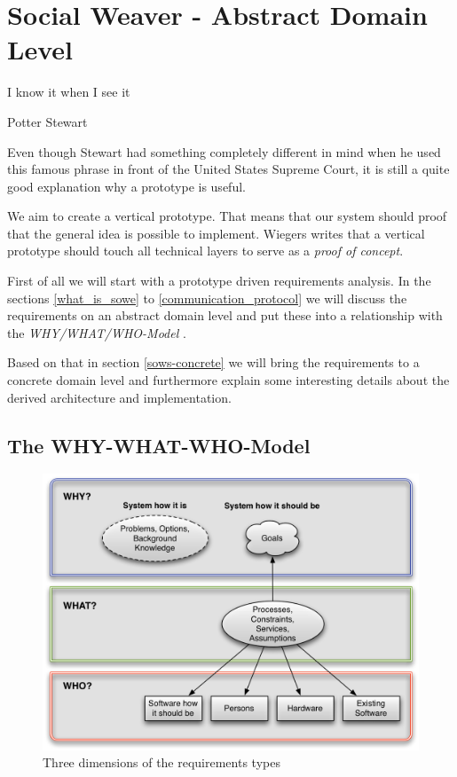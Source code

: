 \section{Social Weaver - Abstract Domain Level}\label{sowe-abstract}

\epigraph{I know it when I see it}{Potter Stewart}

Even though Stewart had something completely different in mind when he used this famous phrase in front of the  United States Supreme Court, it is still a quite good explanation why a prototype is useful. 

We aim to create a vertical prototype. That means that our system should proof that the general idea is possible to implement. Wiegers writes that a vertical prototype should touch all technical layers to serve as a \emph{proof of concept}\cite{wiegers2003software}.

First of all we will start with a prototype driven requirements analysis. In the sections \ref{what_is_sowe}  to \ref{communication_protocol}  we will discuss the requirements on an abstract domain level and put these into a relationship with the \emph{WHY/WHAT/WHO-Model} \cite{van2009requirements}.

Based on that in section \ref{sows-concrete} we will bring the requirements to a concrete domain level and furthermore explain some interesting details about the derived architecture and implementation. 


\subsection{The WHY-WHAT-WHO-Model}\label{why-what-who}
\begin{figure}[h] \centering
		\includegraphics[width=13cm]{images/why-what-who-model.png}
		\caption{Three dimensions of the requirements types\cite{van2009requirements}}
		\label{why-what-who-diagram}
\end{figure} 


